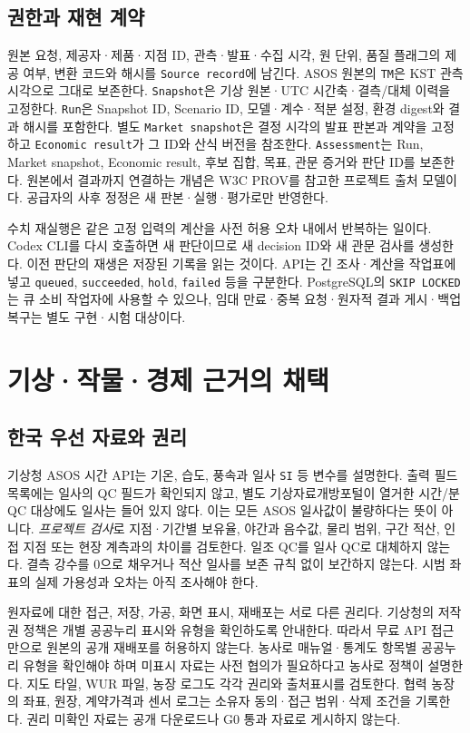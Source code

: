 \documentclass[11pt,a4paper]{article}
\begin{document}
\subsection{권한과 재현 계약}
원본 요청, 제공자·제품·지점 ID, 관측·발표·수집 시각, 원 단위, 품질 플래그의 제공 여부, 변환 코드와 해시를 \texttt{Source record}에 남긴다. ASOS 원본의 \texttt{TM}은 KST 관측시각으로 그대로 보존한다\cite{kma-api}. \texttt{Snapshot}은 기상 원본·UTC 시간축·결측/대체 이력을 고정한다. \texttt{Run}은 Snapshot ID, Scenario ID, 모델·계수·적분 설정, 환경 digest와 결과 해시를 포함한다. 별도 \texttt{Market snapshot}은 결정 시각의 발표 판본과 계약을 고정하고 \texttt{Economic result}가 그 ID와 산식 버전을 참조한다. \texttt{Assessment}는 Run, Market snapshot, Economic result, 후보 집합, 목표, 관문 증거와 판단 ID를 보존한다. 원본에서 결과까지 연결하는 개념은 W3C PROV를 참고한 프로젝트 출처 모델이다\cite{w3c-prov}. 공급자의 사후 정정은 새 판본·실행·평가로만 반영한다.

수치 재실행은 같은 고정 입력의 계산을 사전 허용 오차 내에서 반복하는 일이다. Codex CLI를 다시 호출하면 새 판단이므로 새 decision ID와 새 관문 검사를 생성한다. 이전 판단의 재생은 저장된 기록을 읽는 것이다. API는 긴 조사·계산을 작업표에 넣고 \texttt{queued}, \texttt{succeeded}, \texttt{hold}, \texttt{failed} 등을 구분한다. PostgreSQL의 \texttt{SKIP LOCKED}는 큐 소비 작업자에 사용할 수 있으나, 임대 만료·중복 요청·원자적 결과 게시·백업 복구는 별도 구현·시험 대상이다\cite{postgres-select}.

\section{기상·작물·경제 근거의 채택}
\subsection{한국 우선 자료와 권리}
기상청 ASOS 시간 API는 기온, 습도, 풍속과 일사 \texttt{SI} 등 변수를 설명한다. 출력 필드 목록에는 일사의 QC 필드가 확인되지 않고, 별도 기상자료개방포털이 열거한 시간/분 QC 대상에도 일사는 들어 있지 않다\cite{kma-api,kma-qc}. 이는 모든 ASOS 일사값이 불량하다는 뜻이 아니다. \emph{프로젝트 검사}로 지점·기간별 보유율, 야간과 음수값, 물리 범위, 구간 적산, 인접 지점 또는 현장 계측과의 차이를 검토한다. 일조 QC를 일사 QC로 대체하지 않는다. 결측 강수를 0으로 채우거나 적산 일사를 보존 규칙 없이 보간하지 않는다. 시범 좌표의 실제 가용성과 오차는 아직 조사해야 한다.

원자료에 대한 접근, 저장, 가공, 화면 표시, 재배포는 서로 다른 권리다. 기상청의 저작권 정책은 개별 공공누리 표시와 유형을 확인하도록 안내한다\cite{kma-rights}. 따라서 무료 API 접근만으로 원본의 공개 재배포를 허용하지 않는다. 농사로 매뉴얼·통계도 항목별 공공누리 유형을 확인해야 하며 미표시 자료는 사전 협의가 필요하다고 농사로 정책이 설명한다\cite{nongsaro-rights}. 지도 타일, WUR 파일, 농장 로그도 각각 권리와 출처표시를 검토한다. 협력 농장의 좌표, 원장, 계약가격과 센서 로그는 소유자 동의·접근 범위·삭제 조건을 기록한다. 권리 미확인 자료는 공개 다운로드나 G0 통과 자료로 게시하지 않는다.
\end{document}
